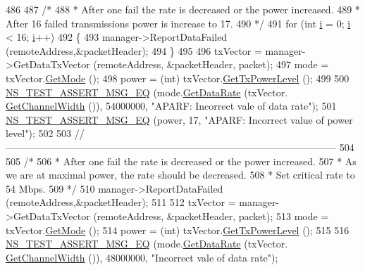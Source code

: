 \begin{DoxyCode}
486 
487   \textcolor{comment}{/*}
488 \textcolor{comment}{   * After one fail the rate is decreased or the power increased.}
489 \textcolor{comment}{   * After 16 failed transmissions power is increase to 17.}
490 \textcolor{comment}{   */}
491   \textcolor{keywordflow}{for} (\textcolor{keywordtype}{int} \hyperlink{bernuolliDistribution_8m_a6f6ccfcf58b31cb6412107d9d5281426}{i} = 0; \hyperlink{bernuolliDistribution_8m_a6f6ccfcf58b31cb6412107d9d5281426}{i} < 16; \hyperlink{bernuolliDistribution_8m_a6f6ccfcf58b31cb6412107d9d5281426}{i}++)
492     \{
493       manager->ReportDataFailed (remoteAddress,&packetHeader);
494     \}
495 
496   txVector = manager->GetDataTxVector (remoteAddress, &packetHeader, packet);
497   mode = txVector.\hyperlink{classns3_1_1WifiTxVector_a497b1f11cad4b8b26251dfa07c9ad1d6}{GetMode} ();
498   power = (int) txVector.\hyperlink{classns3_1_1WifiTxVector_a7c98bd9609ff1c5cefa6e22d6908a2fe}{GetTxPowerLevel} ();
499 
500   \hyperlink{group__testing_ga2a9d78cffb3db8e867c35fff0b698cf5}{NS\_TEST\_ASSERT\_MSG\_EQ} (mode.\hyperlink{classns3_1_1WifiMode_adcfbe150f69da720db23387f733b8a52}{GetDataRate} (txVector.
      \hyperlink{classns3_1_1WifiTxVector_a1f8bfa51778a3e217581eb665f059564}{GetChannelWidth} ()), 54000000, \textcolor{stringliteral}{"APARF: Incorrect vale of data rate"});
501   \hyperlink{group__testing_ga2a9d78cffb3db8e867c35fff0b698cf5}{NS\_TEST\_ASSERT\_MSG\_EQ} (power, 17, \textcolor{stringliteral}{"APARF: Incorrect value of power level"});
502 
503   \textcolor{comment}{//-----------------------------------------------------------------------------------------------------}
504 
505   \textcolor{comment}{/*}
506 \textcolor{comment}{   * After one fail the rate is decreased or the power increased.}
507 \textcolor{comment}{   * As we are at maximal power, the rate should be decreased.}
508 \textcolor{comment}{   * Set critical rate to 54 Mbps.}
509 \textcolor{comment}{   */}
510   manager->ReportDataFailed (remoteAddress,&packetHeader);
511 
512   txVector = manager->GetDataTxVector (remoteAddress, &packetHeader, packet);
513   mode = txVector.\hyperlink{classns3_1_1WifiTxVector_a497b1f11cad4b8b26251dfa07c9ad1d6}{GetMode} ();
514   power = (int) txVector.\hyperlink{classns3_1_1WifiTxVector_a7c98bd9609ff1c5cefa6e22d6908a2fe}{GetTxPowerLevel} ();
515 
516   \hyperlink{group__testing_ga2a9d78cffb3db8e867c35fff0b698cf5}{NS\_TEST\_ASSERT\_MSG\_EQ} (mode.\hyperlink{classns3_1_1WifiMode_adcfbe150f69da720db23387f733b8a52}{GetDataRate} (txVector.
      \hyperlink{classns3_1_1WifiTxVector_a1f8bfa51778a3e217581eb665f059564}{GetChannelWidth} ()), 48000000, \textcolor{stringliteral}{"Incorrect vale of data rate"});

\end{DoxyCode}
